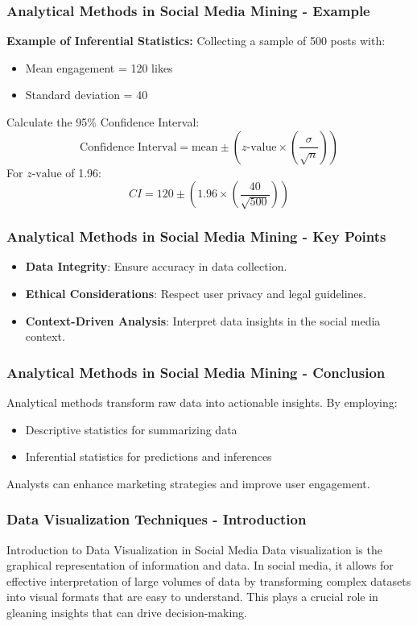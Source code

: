 \documentclass{beamer}
\begin{document}
\begin{frame}[fragile]
    \frametitle{Analytical Methods in Social Media Mining - Example}
    \textbf{Example of Inferential Statistics:}
    Collecting a sample of 500 posts with:
    \begin{itemize}
        \item Mean engagement = 120 likes
        \item Standard deviation = 40
    \end{itemize}
    Calculate the 95\% Confidence Interval:
    \begin{equation}
        \text{Confidence Interval} = \text{mean} \pm (z\text{-value} \times (\frac{\sigma}{\sqrt{n}}))
    \end{equation}
    For \( z\text{-value} \) of 1.96:
    \begin{equation}
        CI = 120 \pm (1.96 \times (\frac{40}{\sqrt{500}}))
    \end{equation}
\end{frame}

\begin{frame}[fragile]
    \frametitle{Analytical Methods in Social Media Mining - Key Points}
    \begin{itemize}
        \item \textbf{Data Integrity}: Ensure accuracy in data collection.
        \item \textbf{Ethical Considerations}: Respect user privacy and legal guidelines.
        \item \textbf{Context-Driven Analysis}: Interpret data insights in the social media context.
    \end{itemize}
\end{frame}

\begin{frame}[fragile]
    \frametitle{Analytical Methods in Social Media Mining - Conclusion}
    Analytical methods transform raw data into actionable insights. By employing:
    \begin{itemize}
        \item Descriptive statistics for summarizing data
        \item Inferential statistics for predictions and inferences
    \end{itemize}
    Analysts can enhance marketing strategies and improve user engagement.
\end{frame}

\begin{frame}[fragile]
    \frametitle{Data Visualization Techniques - Introduction}
    \begin{block}{Introduction to Data Visualization in Social Media}
        Data visualization is the graphical representation of information and data. 
        In social media, it allows for effective interpretation of large volumes of data 
        by transforming complex datasets into visual formats that are easy to understand. 
        This plays a crucial role in gleaning insights that can drive decision-making.
    \end{block}
\end{frame}
\end{document}
